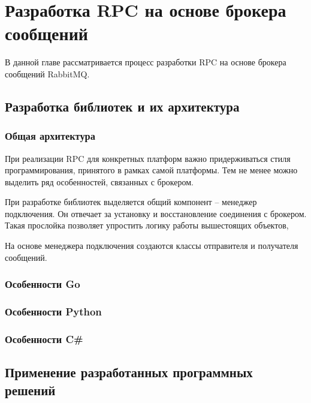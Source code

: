 \chapter{Разработка RPC на основе брокера сообщений}
В данной главе рассматривается процесс разработки RPC на основе
брокера сообщений RabbitMQ.

\section{Разработка библиотек и их архитектура}

\subsection{Общая архитектура}
При реализации RPC для конкретных платформ важно придерживаться стиля
программирования, принятого в рамках самой платформы. Тем не менее
можно выделить ряд особенностей, связанных с брокером.

При разработке библиотек выделяется общий компонент -- менеджер подключения.
Он отвечает за установку и восстановление соединения с брокером.
Такая прослойка позволяет упростить логику работы вышестоящих объектов,

На основе менеджера подключения создаются классы отправителя и получателя
сообщений.

\subsection{Особенности Go}
\subsection{Особенности Python}
\subsection{Особенности C\#}

\section{Применение разработанных программных решений}

